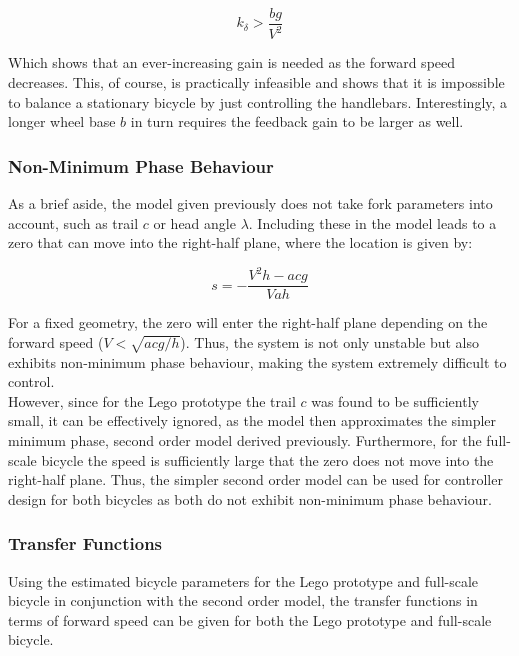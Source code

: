 \begin{equation}
k_{\delta} > \frac{b g}{V^2}
\label{eq:minGain}
\end{equation}

Which shows that an ever-increasing gain is needed as the forward speed decreases. This, of course, is practically infeasible and shows that it is impossible to balance a stationary bicycle by just controlling the handlebars. Interestingly, a longer wheel base $b$ in turn requires the feedback gain to be larger as well.

\subsubsection{Non-Minimum Phase Behaviour}
As a brief aside, the model given previously does not take fork parameters into account, such as trail $c$ or head angle $\lambda$. Including these in the model leads to a zero that can move into the right-half plane, where the location is given by:

\begin{equation*}
s = - \frac{V^2h-acg}{Vah}
\end{equation*}

For a fixed geometry, the zero will enter the right-half plane depending on the forward speed ($V<\sqrt{acg/h}$). Thus, the system is not only unstable but also exhibits non-minimum phase behaviour, making the system extremely difficult to control. \\

However, since for the Lego prototype the trail $c$ was found to be sufficiently small, it can be effectively ignored, as the model then approximates the simpler minimum phase, second order model derived previously. Furthermore, for the full-scale bicycle the speed is sufficiently large that the zero does not move into the right-half plane. Thus, the simpler second order model can be used for controller design for both bicycles as both do not exhibit non-minimum phase behaviour.

\subsubsection{Transfer Functions}
Using the estimated bicycle parameters for the Lego prototype and full-scale bicycle in conjunction with the second order model, the transfer functions in terms of forward speed can be given for both the Lego prototype and full-scale bicycle. \\

